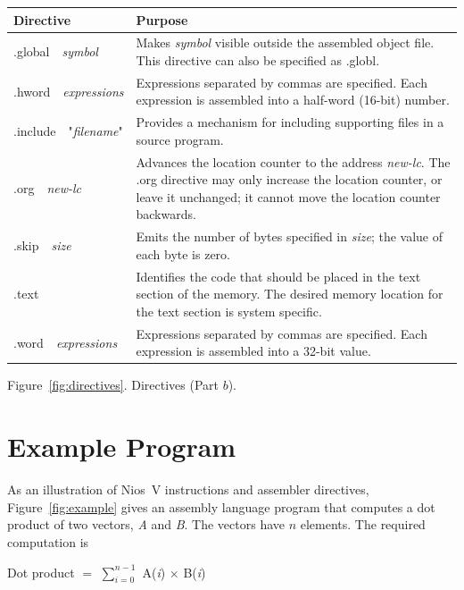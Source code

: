 \documentclass[11pt, twoside, pdftex]{article}
\begin{document}
\begin{center}
\begin{tabular}{p{.22\linewidth}|p{.7\linewidth}}
{\bf Directive} & {\bf Purpose} \\ \hline
\rule[-0.075in]{0in}{0.33in}{\sf .global}~~{\it symbol} & 
Makes {\it symbol} visible outside the assembled object file.
This directive can also be specified as {\sf .globl}.\\
\rule[-0.075in]{0in}{0.33in}{\sf .hword}~~{\it expressions} & 
Expressions separated by commas are specified. Each expression is assembled into
a half-word (16-bit) number.\\
\rule[-0.075in]{0in}{0.33in}{\sf .include}~~"{\it filename}" &
Provides a mechanism for including supporting files in a source program.\\
\rule[-0.075in]{0in}{0.33in}{\sf .org}~~{\it new-lc} &
Advances the location counter to the address {\it new-lc}.
The {\sf .org} directive may only increase the location counter, or leave it unchanged; 
it cannot move the location counter backwards.\\
\rule[-0.075in]{0in}{0.33in}{\sf .skip}~~{\it size} & 
Emits the number of bytes specified in {\it size}; the value of each byte is zero.\\
\rule[-0.075in]{0in}{0.33in}{\sf .text} & 
Identifies the code that should be placed in the text section of the memory.
The desired memory location for the text section is system specific.\\
\rule[-0.075in]{0in}{0.33in}{\sf .word}~~{\it expressions} &
Expressions separated by commas are specified. Each expression is assembled into
a 32-bit value.
\end{tabular}

\vspace{0.25in}
Figure~\ref{fig:directives}. Directives (Part $b$).
\end{center}

\section{Example Program}

As an illustration of Nios~V instructions and assembler directives, 
Figure~\ref{fig:example} gives an assembly language program
that computes a dot product of two vectors, {\it A} and {\it B}. The vectors
have $n$ elements. The required computation is
\begin{center}
Dot product $=$ $\sum_{i = 0}^{n - 1}$ A({\it i}) $\times$ B({\it i})
\end{center}
\end{document}
